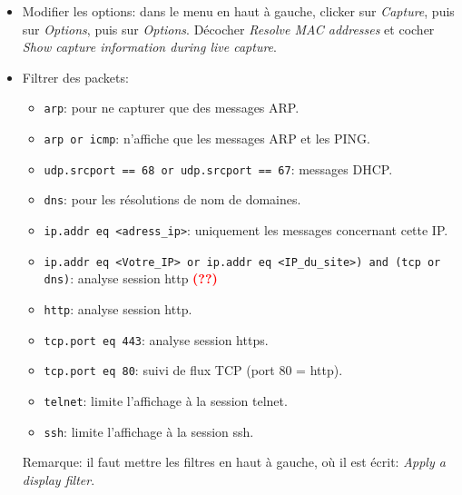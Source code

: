 \documentclass[a4paper]{article}
\renewcommand{\tt}{\texttt}
\begin{document}
\begin{itemize}





\item Modifier les options: dans le menu en haut à gauche, clicker sur \textit{Capture}, puis sur \textit{Options}, puis sur \textit{Options}. Décocher \textit{Resolve MAC addresses} et cocher \textit{Show capture information during live capture}.





\item Filtrer des packets:
\begin{itemize}
    \item \tt{arp}: pour ne capturer que des messages ARP.
    \item \tt{arp or icmp}: n'affiche que les messages ARP et les PING.
    \item \tt{udp.srcport == 68 or udp.srcport == 67}: messages DHCP.
    \item \tt{dns}: pour les résolutions de nom de domaines.
    \item \tt{ip.addr eq <adress\_ip>}: uniquement les messages concernant cette IP.
    \item \tt{ip.addr eq <Votre\_IP> or ip.addr eq <IP\_du\_site>) and (tcp or dns)}: analyse session http \textcolor{red}{\textbf{(??)}}
    \item \tt{http}: analyse session http.
    \item \tt{tcp.port eq 443}: analyse session https.
    \item \tt{tcp.port eq 80}: suivi de flux TCP (port 80 = http).
    \item \tt{telnet}: limite l'affichage à la session telnet.
    \item \tt{ssh}: limite l'affichage à la session ssh.
\end{itemize}
Remarque: il faut mettre les filtres en haut à gauche, où il est écrit: \textit{Apply a display filter}.





\end{itemize}
\end{document}
